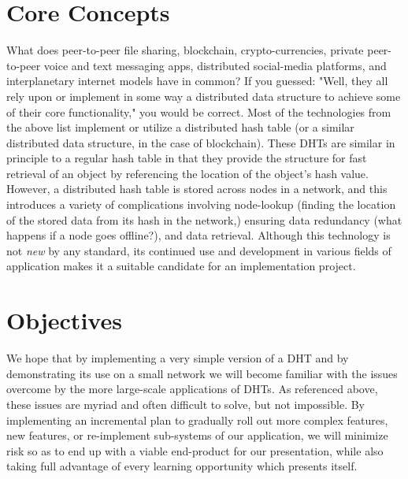 \documentclass[12pt]{article}
\begin{document}
    \section{Core Concepts}
    What does peer-to-peer file sharing\cite{bittorrent-wiki}, blockchain,
    crypto-currencies\cite{ethereum-rlp}, private peer-to-peer voice and text
    messaging apps\cite{tox-site}, distributed social-media
    platforms\cite{distributed-social-networks}, and interplanetary internet
    models\cite{ipfs-site} have in common?  If you guessed: "Well, they all rely
    upon or implement in some way a distributed data structure to achieve some
    of their core functionality," you would be correct.  Most of the
    technologies from the above list implement or utilize a distributed hash
    table (or a similar distributed data structure, in the case of blockchain).
    These DHTs are similar in principle to a regular hash table in that they
    provide the structure for fast retrieval of an object by referencing the
    location of the object's hash value.  However, a distributed hash table is
    stored across nodes in a network, and this introduces a variety of
    complications involving node-lookup (finding the location of the stored data
    from its hash in the network,) ensuring data redundancy (what happens if a
    node goes offline?), and data retrieval.  Although this technology is not
    \textit{new} by any standard, its continued use and development in various
    fields of application makes it a suitable candidate for an implementation
    project.
    
    \section{Objectives}
    We hope that by implementing a very simple version of a DHT and by demonstrating
    its use on a small network we will become familiar with the issues
    overcome by the more large-scale applications of DHTs.  As referenced above,
    these issues are myriad and often difficult to solve, but not impossible.
    By implementing an incremental plan to gradually roll out more complex features, new
    features, or re-implement sub-systems of our application, we will minimize
    risk so as to end up with a viable end-product for our presentation, while
    also taking full advantage of every learning opportunity which presents
    itself.
\end{document}
